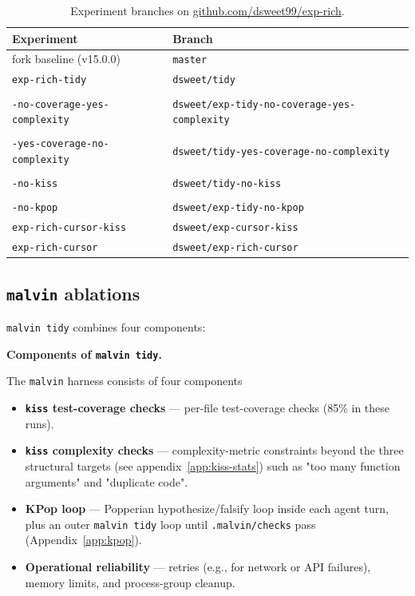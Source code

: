 \documentclass[11pt]{article}
\newcommand{\exptidy}[1]{\makecell[l]{\texttt{exp-rich-tidy}\\[1pt]\hspace{0.75em}\texttt{#1}}}
\begin{document}
\begin{table}[ht]
  \centering
  \caption{Experiment branches on \url{github.com/dsweet99/exp-rich}.}
  \label{tab:branches}
  \small
  \begin{tabular}{@{}ll@{}}
    \toprule
    Experiment & Branch \\
    \midrule
    fork baseline (v15.0.0) & \texttt{master} \\
    \texttt{exp-rich-tidy} & \texttt{dsweet/tidy} \\
    \exptidy{-no-coverage-yes-complexity} & \texttt{dsweet/exp-tidy-no-coverage-yes-complexity} \\
    \exptidy{-yes-coverage-no-complexity} & \texttt{dsweet/tidy-yes-coverage-no-complexity} \\
    \exptidy{-no-kiss} & \texttt{dsweet/tidy-no-kiss} \\
    \exptidy{-no-kpop} & \texttt{dsweet/exp-tidy-no-kpop} \\
    \texttt{exp-rich-cursor-kiss} & \texttt{dsweet/exp-cursor-kiss} \\
    \texttt{exp-rich-cursor} & \texttt{dsweet/exp-rich-cursor} \\
    \bottomrule
  \end{tabular}
\end{table}

\subsection{\texttt{malvin} ablations}
\label{sec:ablations}

\texttt{malvin tidy} combines four components:

\textbf{Components of \texttt{malvin tidy}.}

The \texttt{malvin} harness consists of four components

\begin{itemize}[nosep]
  \item \textbf{\texttt{kiss} test-coverage checks} --- per-file test-coverage checks (85\% in these runs).
  \item \textbf{\texttt{kiss} complexity checks} --- complexity-metric constraints beyond the three structural targets (see 
  appendix~\ref{app:kiss-stats}) such as "too many function arguments" and "duplicate code".
  \item \textbf{KPop loop} --- Popperian hypothesize/falsify loop inside each agent turn, plus an 
  outer \texttt{malvin tidy} loop until \texttt{.malvin/checks} pass (Appendix~\ref{app:kpop}).
  \item \textbf{Operational reliability} --- retries (e.g., for network or API failures), memory limits, and process-group cleanup.
\end{itemize}
\end{document}
